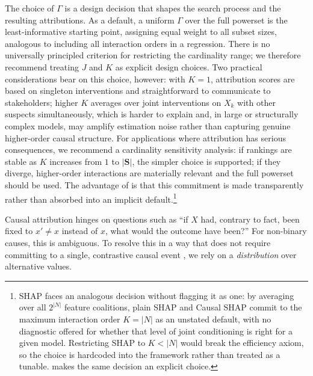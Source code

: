 The choice of $\Gamma$ is a design decision that shapes the search process and the
resulting attributions.
As a default, a uniform $\Gamma$ over the full powerset is the least-informative
starting point, assigning equal weight to all subset sizes, analogous to including all
interaction orders in a regression. There is no universally principled criterion for
restricting the cardinality range; we therefore recommend treating $J$ and $K$ as
explicit design choices. Two practical considerations bear on this choice, however: with $K=1$, attribution
scores are based on singleton interventions and straightforward to communicate to
stakeholders; higher $K$ averages over joint interventions on $X_k$ with other suspects
simultaneously, which is harder to explain and, in large or structurally complex models,
may amplify estimation noise rather than capturing genuine higher-order causal structure.
For applications where attribution has serious consequences, we recommend a
cardinality sensitivity analysis: if rankings are stable as $K$ increases from $1$ to
$|\mathbf{S}|$, the simpler choice is supported; if they diverge, higher-order
interactions are materially relevant and the full powerset should be used. The advantage of \ourapproach is that this commitment is made transparently rather than
absorbed into an implicit default.\footnote{SHAP faces an analogous decision without
flagging it as one: by averaging over all $2^{|N|}$ feature coalitions, plain SHAP and
Causal SHAP commit to the maximum interaction order $K=|N|$ as an unstated default,
with no diagnostic offered for whether that level of joint conditioning is right for a
given model. Restricting SHAP to $K<|N|$ would break the efficiency axiom, so the
choice is hardcoded into the framework rather than treated as a tunable. \ourapproach{}
makes the same decision an explicit choice.}

Causal attribution hinges on questions such as ``if $X$ had, contrary to fact, been fixed to $x'\ne x$ instead of $x$, what would the outcome have been?'' For non-binary causes, this is ambiguous. To resolve this in a way that does not require committing to a single, contrastive causal event \citep{kawakammi_2024_poc_for_cont_and_vec}, we rely on a \textit{distribution} over alternative values.


